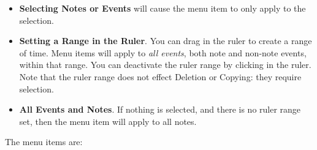 \documentclass[twoside,10pt]{article}
\begin{document}
\begin{itemize}
\item {\bf Selecting Notes or Events} will cause the menu item to only apply to the selection.
\item {\bf Setting a Range in the Ruler}.  You can drag in the ruler to create a range of time.  Menu items will apply to {\it all events}, both note and non-note events, within that range.  You can deactivate the ruler range by clicking in the ruler.  Note that the ruler range does not effect Deletion or Copying: they require selection.
\item {\bf All Events and Notes}.  If nothing is selected, and there is no ruler range set, then the menu item will apply to all notes.
\end{itemize}

\noindent The menu items are:
\end{document}
